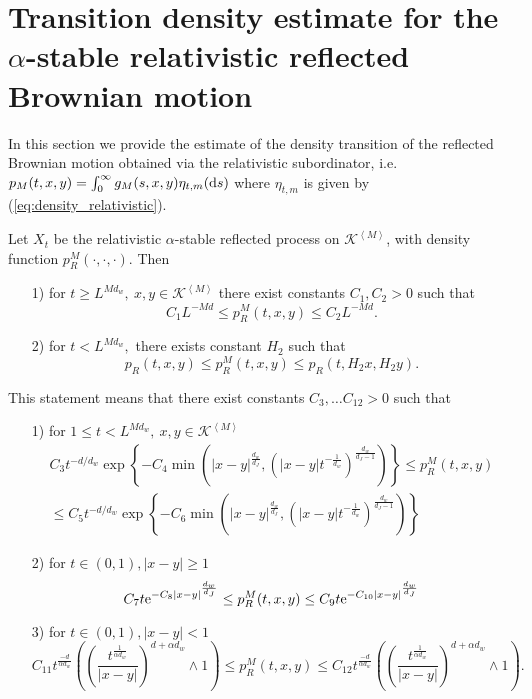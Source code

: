 \documentclass[11pt]{article}
\begin{document}
\section{Transition density estimate for the $\alpha$-stable relativistic reflected Brownian motion}
In this section we provide the estimate of the density transition  of the  reflected Brownian motion obtained via the relativistic subordinator, i.e. $p_M(t,x,y) = \int_0^{\infty} g_M(s,x,y) \eta_{t,m}({\rm d}s)$  where $\eta_{t,m}$ is given by (\ref{eq:density_relativistic}).
\begin{theo}\label{th:g_m_rel}
Let $X_{t}$ be the relativistic $\alpha$-stable reflected process on $\mathcal{K}^{\left\langle M \right\rangle}$, with density function $p^M_R(\cdot, \cdot, \cdot)$. Then
\begin{enumerate}
\item[1)] for $ t \geq L^{Md_w},  \ x,y \in \mathcal{K}^{\left\langle M \right\rangle}$ there exist constants $C_1,C_2 > 0$ such that
\begin{equation}
C_1L^{-Md} \leq p_R^M(t,x,y) \leq C_2L^{-Md}.
\end{equation}
\item[2)] for $t < L^{Md_w},$ there exists constant $H_2$ such that
$$
p_R(t,x,y) \leq p_R^M(t,x,y) \leq p_R(t,H_2x,H_2y).
$$
\end{enumerate}
\end{theo}
This statement means that there exist constants $C_3,\ldots C_{12} > 0$ such that
\begin{enumerate}
\item[1)] for $1 \leq t < L^{Md_w},  \ x,y \in \mathcal{K}^{\left\langle M \right\rangle}$
\begin{multline}
C_3t^{-d/d_w} \exp\left\{-C_4\min\left(|x-y|^{\frac{d_{w}}{d_{J}}},\left({|x-y|}{t^{-\frac{1}{d_w}}}\right)^{\frac{d_{w}}{d_{J}-1}}\right)\right\} \leq p_R^M(t,x,y)\\
 \leq C_5t^{-d/d_w} \exp\left\{-C_6\min\left(|x-y|^{\frac{d_{w}}{d_{J}}},\left({|x-y|}{t^{-\frac{1}{d_w}}}\right)^{\frac{d_{w}}{d_{J}-1}}\right)\right\}
\end{multline}
\item[2)] for $t \in (0,1), |x-y| \geq 1$
\begin{equation}
C_7t{\rm e}^{-C_8|x-y|^{\frac{d_{w}}{d_{J}}}} \leq p_R^M(t,x,y) \leq C_9t{\rm e}^{-C_{10}|x-y|^{\frac{d_{w}}{d_{J}}}}
\end{equation}
\item[3)] for $t \in (0,1), |x-y| < 1$
\begin{equation}
C_{11}t^{\frac{-d}{\alpha d_{w}}}\left(\left(\frac{t^{\frac{1}{\alpha d_{w}}}}{|x-y|}\right)^{d +\alpha d_{w}} \wedge 1\right) \leq p_R^M(t,x,y) \leq C_{12}
 t^{\frac{-d}{\alpha d_{w}}}\left(\left(\frac{t^{\frac{1}{\alpha d_{w}}}}{|x-y|}\right)^{d +\alpha d_{w}} \wedge 1\right).
\end{equation}
\end{enumerate}
\end{document}
